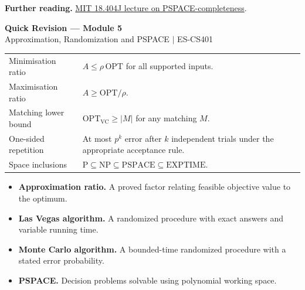 \documentclass[12pt,a4paper]{article}
\renewcommand{\arraystretch}{1.45}
\begin{document}
\textbf{Further reading.} \href{https://ocw.mit.edu/courses/18-404j-theory-of-computation-fall-2020/resources/lecture-18-pspace-completeness/}{MIT 18.404J lecture on PSPACE-completeness}.

\newpage
\begin{center}
  {\large\bfseries\color{myred} Quick Revision --- Module 5}\\[3pt]
  {\small\color{mydark} Approximation, Randomization and PSPACE $|$ ES-CS401}
\end{center}
\noindent{\color{myred}\rule{\linewidth}{1.2pt}}\par\vspace{4pt}

\begin{tcolorbox}[formulabox, title={Key Concepts at a Glance}]
\renewcommand{\arraystretch}{1.35}
\noindent\begin{tabularx}{\linewidth}{B{4.5cm}Y}
Minimisation ratio & $A\le\rho\,\mathrm{OPT}$ for all supported inputs. \\[3pt]
Maximisation ratio & $A\ge\mathrm{OPT}/\rho$. \\[3pt]
Matching lower bound & $\mathrm{OPT}_{\mathrm{VC}}\ge|M|$ for any matching $M$. \\[3pt]
One-sided repetition & At most $p^k$ error after $k$ independent trials under the appropriate acceptance rule. \\[3pt]
Space inclusions & $\mathrm P\subseteq\mathrm{NP}\subseteq\mathrm{PSPACE}\subseteq\mathrm{EXPTIME}$. \\[3pt]
\end{tabularx}\par
\end{tcolorbox}

\begin{tcolorbox}[defbox, title={One-Line Definitions}]
\begin{itemize}[leftmargin=*, itemsep=3pt, topsep=4pt]
  \item \textbf{Approximation ratio.} A proved factor relating feasible objective value to the optimum.
  \item \textbf{Las Vegas algorithm.} A randomized procedure with exact answers and variable running time.
  \item \textbf{Monte Carlo algorithm.} A bounded-time randomized procedure with a stated error probability.
  \item \textbf{PSPACE.} Decision problems solvable using polynomial working space.
\end{itemize}
\end{tcolorbox}
\end{document}
